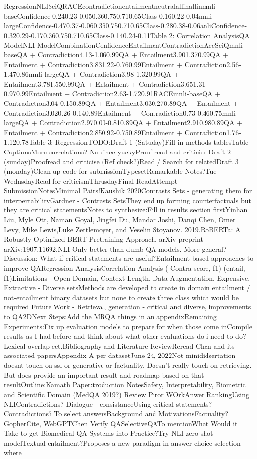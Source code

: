 \documentclass{scrbook}
\begin{document}
RegressionNLISciQRACEcontradictionentailmentneutralallinallinmnli-baseConfidence-0.240.23-0.050.360.750.710.65Class-0.160.22-0.04mnli-largeConfidence-0.470.37-0.060.360.750.710.65Class-0.280.38-0.06anliConfidence-0.320.29-0.170.360.750.710.65Class-0.140.24-0.11Table 2: Correlation AnalysisQA ModelNLI ModelCombinationConfidenceEntailmentContradictionAccSciQmnli-baseQA + Contradiction4.13-1.060.99QA + Entailment3.901.370.99QA + Entailment + Contradiction3.831.22-0.760.99Entailment + Contradiction2.56-1.470.86mnli-largeQA + Contradiction3.98-1.320.99QA + Entailment3.781.550.99QA + Entailment + Contradiction3.651.31-0.970.99Entailment + Contradiction2.63-1.720.91RACEmnli-baseQA + Contradiction3.04-0.150.89QA + Entailment3.030.270.89QA + Entailment + Contradiction3.020.26-0.140.89Entailment + Contradiction0.73-0.460.75mnli-largeQA + Contradiction2.970.00-0.810.89QA + Entailment2.910.980.89QA + Entailment + Contradiction2.850.92-0.750.89Entailment + Contradiction1.76-1.120.78Table 3: RegressionTODO:Draft 1 (Satuday)Fill in methods tablesTable CaptionsMore correlations? No since yuckyProof read and criticise Draft 2 (sunday)Proofread and criticise (Ref check?)Read / Search for relatedDraft 3 (monday)Clean up code for submissionTypesetRemarkable Notes?Tue-WednsdayRead for criticismThrusdayFinal ReadAttempt SubmissionNotesMinimal Pairs!Kaushik 2020Contrasts Sets - generating them for interpertabilityGardner - Contrasts SetsThey end up forming counterfactuals but they are critical statementsNotes to synthesize:Fill in results section firstYinhan Liu, Myle Ott, Naman Goyal, Jingfei Du, Mandar Joshi, Danqi Chen, Omer Levy, Mike Lewis,Luke Zettlemoyer, and Veselin Stoyanov. 2019.RoBERTa: A Robustly Optimized BERT Pretraining Approach. arXiv preprint arXiv:1907.11692.NLI Only better than dumb QA models. More general?Discussion: What if critical statements are useful?Entailment based approaches to improve QARegression AnalysisCorrelation Analysis (-Contra score, f1) (entail, f1)Limitations - Open Domain, Context Length, Data Augmentation, Expensive, Extractive - Diverse setsMethods are developed to create in domain entailment / not-entailment binary datasets but none to create three class which would be required       Future Work - Retrieval, generation - critical and diverse, improvements to QA2DNext Steps:Add the MRQA things in an appendixRemaining Experiments:Fix up evaluation models to prepare for when those come inCompile results as I had before and think about what other evaluations do i need to do?Lexical overlap ect.Bibliography and Literature ReviewReread Chen and its associated papersAppendix A per datasetJune 24, 2022Not minididsertation doesnt touch on ssl or generative or factuality. Doesn’t really touch on retrieving. But does provide an important result and roadmap based on that resultOutline:Kamath Paper:troduction NotesSafety, Interpretability, Biometric and Scientific Domain (MedQA 2019?) Review Piror WOrkAnwer RankingUsing NLIContradictions? Dialogue - consistanceUsing critical statements? Contradictions? To select answersBackground and MotivationsFactuality? GopherCite, WebGPTChen Verify QASelectiveQATo mentionWhat Would it Take to get Biomedical QA Systems into Practice?Try NLI zero shot modelTextual entailment?Proposes a new paradigm in answer choice selection where 
\end{document}
